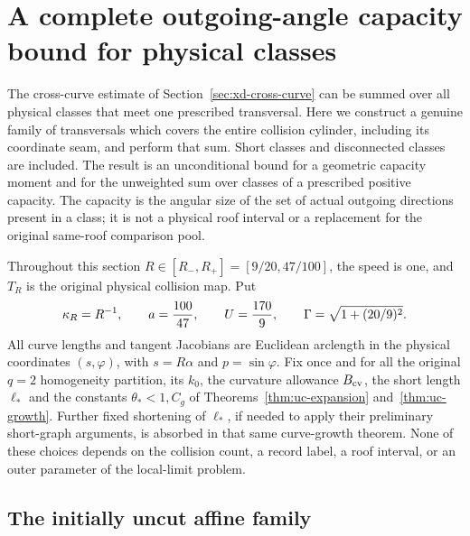 \section{A complete outgoing-angle capacity bound for physical classes}
\label{tc:section}

The cross-curve estimate of Section~\ref{sec:xd-cross-curve} can be
summed over all physical classes that meet one prescribed transversal.
Here we construct a genuine family of transversals which covers the
entire collision cylinder, including its coordinate seam, and perform
that sum.  Short classes and disconnected classes are included.  The
result is an unconditional bound for a geometric capacity moment and
for the unweighted sum over classes of a prescribed positive capacity.
The capacity is the angular size of the set of actual outgoing
directions present in a class; it is not a physical roof interval or
a replacement for the original same-roof comparison pool.

Throughout this section $R\in[R_-,R_+]=[9/20,47/100]$, the speed is
one, and $T_R$ is the original physical collision map.  Put
\[
 \kappa_R=R^{-1},\qquad a={100\over47},\qquad
 U={170\over9},\qquad \Gamma=\sqrt{1+(20/9)^2}.
\]
All curve lengths and tangent Jacobians are Euclidean arclength in
the physical coordinates $(s,\varphi)$, with $s=R\alpha$ and
$p=\sin\varphi$.  Fix once and for all the original $q=2$
homogeneity partition, its $k_0$, the curvature allowance $B_{\rm cv}$,
the short length $\ell_*$ and the constants $\theta_*<1,C_g$ of
Theorems~\ref{thm:uc-expansion} and~\ref{thm:uc-growth}.  Further
fixed shortening of $\ell_*$, if needed to apply their preliminary
short-graph arguments, is absorbed in that same curve-growth theorem.
None of these choices depends on the collision count, a record label,
a roof interval, or an outer parameter of the local-limit problem.

\subsection{The initially uncut affine family}

